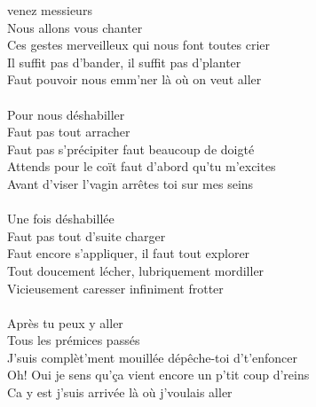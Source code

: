 
 venez messieurs
\\Nous allons vous chanter
\\Ces gestes merveilleux qui nous font toutes crier
\\Il suffit pas d'bander, il suffit pas d'planter
\\Faut pouvoir nous emm'ner là où on veut aller
\\\\Pour nous déshabiller
\\Faut pas tout arracher
\\Faut pas s'précipiter faut beaucoup de doigté
\\Attends pour le coït faut d'abord qu'tu m'excites
\\Avant d'viser l'vagin arrêtes toi sur mes seins
\\\\Une fois déshabillée
\\Faut pas tout d'suite charger
\\Faut encore s'appliquer, il faut tout explorer
\\Tout doucement lécher, lubriquement mordiller
\\Vicieusement caresser infiniment frotter
\\\\Après tu peux y aller
\\Tous les prémices passés
\\J'suis complèt'ment mouillée dépêche-toi d't'enfoncer
\\Oh! Oui je sens qu'ça vient encore un p'tit coup d'reins
\\Ca y est j'suis arrivée là où j'voulais aller

\breakpage